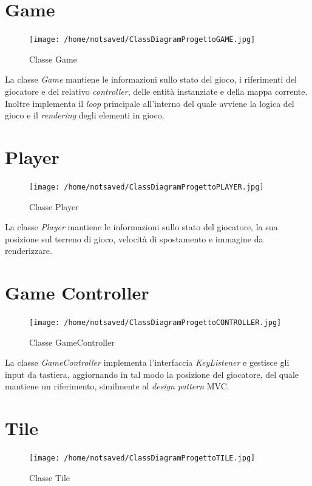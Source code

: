 \documentclass[11pt]{book}
\begin{document}
\section{Game}
\begin{figure}[H]
\centering
\texttt{[image: /home/notsaved/ClassDiagramProgettoGAME.jpg]}
\caption{Classe Game}
\label{clssgame}
\end{figure}
La classe \emph{Game} mantiene le informazioni sullo stato del gioco, i riferimenti del giocatore e del relativo \emph{controller}, delle entit\`a instanziate e della mappa corrente. Inoltre implementa il \emph{loop} principale all'interno del quale avviene la logica del gioco e il \emph{rendering} degli elementi in gioco.

\section{Player}
\begin{figure}[H]
\centering
\texttt{[image: /home/notsaved/ClassDiagramProgettoPLAYER.jpg]}
\caption{Classe Player}
\label{clssplyr}
\end{figure}

La classe \emph{Player} mantiene le informazioni sullo stato del giocatore, la sua posizione sul terreno di gioco, velocit\`a di spostamento e immagine da renderizzare.

\section{Game Controller}
\begin{figure}[H]
\centering
\texttt{[image: /home/notsaved/ClassDiagramProgettoCONTROLLER.jpg]}
\caption{Classe GameController}
\label{gameController}
\end{figure}

La classe \emph{GameController} implementa l'interfaccia \emph{KeyListener} e gestisce gli input da tastiera, aggiornando in tal modo la posizione del giocatore, del quale mantiene un riferimento, similmente al \emph{design pattern} MVC.

\section{Tile}
\begin{figure}[H]
\centering
\texttt{[image: /home/notsaved/ClassDiagramProgettoTILE.jpg]}
\caption{Classe Tile}
\label{clssTile}
\end{figure}
\end{document}
